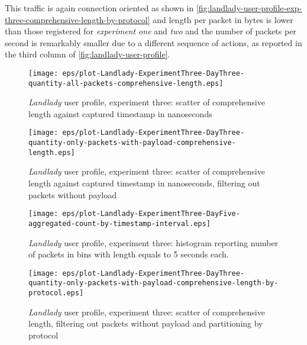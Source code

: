\documentclass[10pt,a4paper]{article}
\begin{document}
    This traffic is again connection oriented as shown in
    \autoref{fig:landlady-user-profile-exp-three-comprehensive-length-by-protocol}
    and length per packet in bytes is lower than those registered for
    \emph{experiment one} and \emph{two} and the number of packets per
    second is remarkably smaller due to a different sequence of
    actions, as reported in the third column of
    \autoref{fig:landlady-user-profile}.

    \begin{figure}
      \centering
      \texttt{[image: eps/plot-Landlady-ExperimentThree-DayThree-quantity-all-packets-comprehensive-length.eps]}
      \caption{\emph{Landlady} user profile, experiment three: scatter
        of comprehensive length against captured timestamp in
        nanoseconds}
      \label{fig:landlady-user-profile-exp-three-comprehensive-length-scatter}
    \end{figure}

    \begin{figure}
      \centering
      \texttt{[image: eps/plot-Landlady-ExperimentThree-DayThree-quantity-only-packets-with-payload-comprehensive-length.eps]}
      \caption{\emph{Landlady} user profile, experiment three: scatter
        of comprehensive length against captured timestamp in
        nanoseconds, filtering out packets without payload}
      \label{fig:landlady-user-profile-exp-three-comprehensive-length-scatter-filtering-on-payload}
    \end{figure}
    
    \begin{figure}
      \centering
      \texttt{[image: eps/plot-Landlady-ExperimentThree-DayFive-aggregated-count-by-timestamp-interval.eps]}
      \caption{\emph{Landlady} user profile, experiment three: histogram
        reporting number of packets in bins with length equals to 5
        seconds each.}
      \label{fig:landlady-user-profile-exp-three-count-histogram}
    \end{figure}

    \begin{figure}
      \centering
      \texttt{[image: eps/plot-Landlady-ExperimentThree-DayThree-quantity-only-packets-with-payload-comprehensive-length-by-protocol.eps]}
      \caption{\emph{Landlady} user profile, experiment three: scatter
        of comprehensive length, filtering out packets without payload
        and partitioning by protocol}
      \label{fig:landlady-user-profile-exp-three-comprehensive-length-by-protocol}
    \end{figure}
\end{document}
